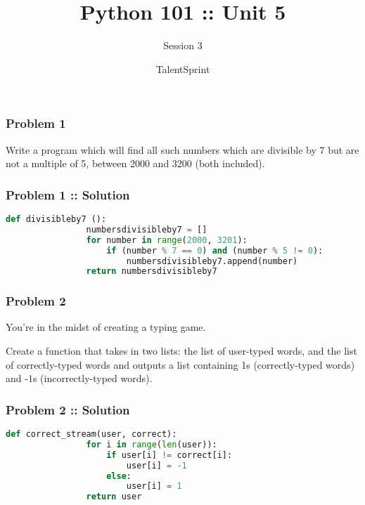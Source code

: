 \documentclass[14pt]{beamer}
\title{Python 101 :: Unit 5}
\subtitle{Session 3}
\date{}
\author[TS]{TalentSprint}
\begin{document}
    \begin{frame}
        \titlepage
    \end{frame}
    \begin{frame}
        \frametitle{Problem 1}
        \alert{Write a program which will find all such numbers which are divisible by 7 but are not a multiple of 5, between 2000 and 3200 (both included).}
    \end{frame}
    \begin{frame}[containsverbatim]
        \frametitle{Problem 1 :: Solution}
        \begin{lstlisting}[language=Python]
            def divisibleby7 ():
                numbersdivisibleby7 = []
                for number in range(2000, 3201):
                    if (number % 7 == 0) and (number % 5 != 0):
                        numbersdivisibleby7.append(number)
                return numbersdivisibleby7
        \end{lstlisting}
    \end{frame}

    \begin{frame}
        \frametitle{Problem 2}
        You're in the midst of creating a typing game.
        
        \alert{Create a function that takes in two lists: the list of user-typed words, and the list of correctly-typed words and outputs a list containing 1s (correctly-typed words) and -1s (incorrectly-typed words).}
    \end{frame}

    \begin{frame}[containsverbatim]
        \frametitle{Problem 2 :: Solution}
        \begin{lstlisting}[language=Python]
            def correct_stream(user, correct):
                for i in range(len(user)):
                    if user[i] != correct[i]: 
                        user[i] = -1
                    else: 
                        user[i] = 1
                return user
        \end{lstlisting}
    \end{frame}
\end{document}
